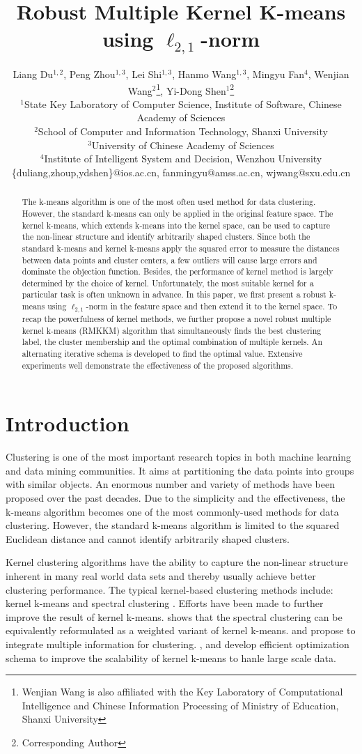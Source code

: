\documentclass{article}
\title{Robust Multiple Kernel K-means using $\ell_{2,1}$-norm}
\author{Liang Du$^{1,2}$, Peng Zhou$^{1,3}$, Lei Shi$^{1,3}$, Hanmo Wang$^{1,3}$, Mingyu Fan$^{4}$, Wenjian Wang$^{2}$\thanks{Wenjian Wang is also affiliated with the Key Laboratory of Computational Intelligence and Chinese Information Processing of Ministry of Education, Shanxi University}, Yi-Dong Shen$^{1}$\thanks{Corresponding Author} \\
$^{1}$State Key Laboratory of Computer Science, Institute of Software, Chinese Academy of Sciences\\
$^{2}$School of Computer and Information Technology, Shanxi University \\
$^{3}$University of Chinese Academy of Sciences \\
$^{4}$Institute of Intelligent System and Decision, Wenzhou University\\
\{duliang,zhoup,ydshen\}@ios.ac.cn, fanmingyu@amss.ac.cn, wjwang@sxu.edu.cn
}
\begin{document}
\maketitle

\begin{abstract}
The k-means algorithm is one of the most often used method for data clustering. However, the standard k-means can only be applied in the original feature space. The kernel k-means, which extends k-means into the kernel space, can be used to capture the non-linear structure and identify arbitrarily shaped clusters. Since both the standard k-means and kernel k-means apply the squared error to measure the distances between data points and cluster centers, a few outliers will cause large errors and dominate the objection function. Besides, the performance of kernel method is largely determined by the choice of kernel. Unfortunately, the most suitable kernel for a particular task is often unknown in advance. In this paper, we first present a robust k-means using $\ell_{2,1}$-norm in the feature space and then extend it to the kernel space. To recap the powerfulness of kernel methods, we further propose a novel robust multiple kernel k-means (RMKKM) algorithm that simultaneously finds the best clustering label, the cluster membership and the optimal combination of multiple kernels. An alternating iterative schema is developed to find the optimal value. Extensive experiments well demonstrate the effectiveness of the proposed algorithms.
\end{abstract}


\section{Introduction}
Clustering is one of the most important research topics in both machine learning and data mining communities. It aims at partitioning the data points into groups with similar objects. An enormous number and variety of methods have been proposed over the past decades. Due to the simplicity and the effectiveness, the k-means algorithm \cite{wu2008top} becomes one of the most commonly-used methods for data clustering. However, the standard k-means algorithm is limited to the squared Euclidean distance and cannot identify arbitrarily shaped clusters.

Kernel clustering algorithms have the ability to capture the non-linear structure inherent in many real world data sets and thereby usually achieve better clustering performance. The typical kernel-based clustering methods include: kernel k-means \cite{scholkopf1998nonlinear} and spectral clustering \cite{ng2002spectral}. Efforts have been made to further improve the result of kernel k-means. \cite{dhillon2007weighted} shows that the spectral clustering can be equivalently reformulated as a weighted variant of kernel k-means. \cite{yu2012optimized} and \cite{huang2012multiple} propose to integrate multiple information for clustering. \cite{chitta2011approximate}, \cite{chitta2012efficient} and \cite{elgohary2014Embd} develop efficient optimization schema to improve the scalability of kernel k-means to hanle large scale data.
\end{document}

